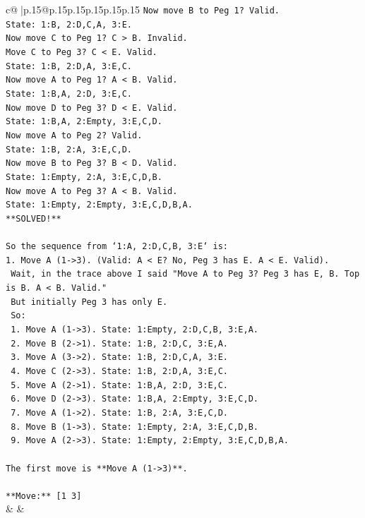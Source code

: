 \documentclass{article}
\begin{document}
{\begin{supertabular}{c@{$\;$}|p{.15\linewidth}@{}p{.15\linewidth}p{.15\linewidth}p{.15\linewidth}p{.15\linewidth}p{.15\linewidth}}
{{{\texttt{Now move B to Peg 1? Valid.} \\
\texttt{State: 1:B, 2:D,C,A, 3:E.} \\
\texttt{Now move C to Peg 1? C > B. Invalid.} \\
\texttt{Move C to Peg 3? C < E. Valid.} \\
\texttt{State: 1:B, 2:D,A, 3:E,C.} \\
\texttt{Now move A to Peg 1? A < B. Valid.} \\
\texttt{State: 1:B,A, 2:D, 3:E,C.} \\
\texttt{Now move D to Peg 3? D < E. Valid.} \\
\texttt{State: 1:B,A, 2:Empty, 3:E,C,D.} \\
\texttt{Now move A to Peg 2? Valid.} \\
\texttt{State: 1:B, 2:A, 3:E,C,D.} \\
\texttt{Now move B to Peg 3? B < D. Valid.} \\
\texttt{State: 1:Empty, 2:A, 3:E,C,D,B.} \\
\texttt{Now move A to Peg 3? A < B. Valid.} \\
\texttt{State: 1:Empty, 2:Empty, 3:E,C,D,B,A.} \\
\texttt{**SOLVED!**} \\
\\ 
\texttt{So the sequence from `1:A, 2:D,C,B, 3:E` is:} \\
\texttt{1. Move A (1{-}>3). (Valid: A < E? No, Peg 3 has E. A < E. Valid).} \\
\texttt{   Wait, in the trace above I said "Move A to Peg 3? Peg 3 has E, B. Top is B. A < B. Valid."} \\
\texttt{   But initially Peg 3 has only E.} \\
\texttt{   So:} \\
\texttt{   1. Move A (1{-}>3). State: 1:Empty, 2:D,C,B, 3:E,A.} \\
\texttt{   2. Move B (2{-}>1). State: 1:B, 2:D,C, 3:E,A.} \\
\texttt{   3. Move A (3{-}>2). State: 1:B, 2:D,C,A, 3:E.} \\
\texttt{   4. Move C (2{-}>3). State: 1:B, 2:D,A, 3:E,C.} \\
\texttt{   5. Move A (2{-}>1). State: 1:B,A, 2:D, 3:E,C.} \\
\texttt{   6. Move D (2{-}>3). State: 1:B,A, 2:Empty, 3:E,C,D.} \\
\texttt{   7. Move A (1{-}>2). State: 1:B, 2:A, 3:E,C,D.} \\
\texttt{   8. Move B (1{-}>3). State: 1:Empty, 2:A, 3:E,C,D,B.} \\
\texttt{   9. Move A (2{-}>3). State: 1:Empty, 2:Empty, 3:E,C,D,B,A.} \\
\\ 
\texttt{The first move is **Move A (1{-}>3)**.} \\
\\ 
\texttt{**Move:** {[}1 3{]}} \\
            }
        }
    }
    & & \\ \\


\end{supertabular}}
\end{document}
